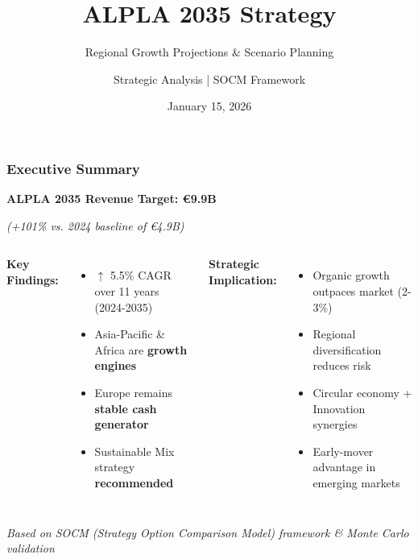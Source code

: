 \documentclass[aspectratio=169,12pt,xcolor=dvipsnames]{beamer}
\title{\textbf{ALPLA 2035 Strategy}}
\subtitle{Regional Growth Projections \& Scenario Planning}
\author{Strategic Analysis | SOCM Framework}
\date{January 15, 2026}
\institute{Evidence-Based Framework for Economic and Social Behavior}
\newcommand{\highlight}[1]{{\color{alpla_blue}\textbf{#1}}}
\newcommand{\increase}[1]{{\color{alpla_green}$\uparrow$ #1}}
\begin{document}

\frame{\titlepage}


\begin{frame}
  \frametitle{Executive Summary}

  \begin{center}
    \large
    \textbf{ALPLA 2035 Revenue Target: \highlight{€9.9B}}

    \vspace{0.5cm}
    \textit{(+101\% vs. 2024 baseline of €4.9B)}
  \end{center}

  \vspace{1cm}

  \begin{columns}[T]
    \textbf{Key Findings:}
    \begin{itemize}
      \item \increase{5.5\% CAGR} over 11 years (2024-2035)
      \item Asia-Pacific \& Africa are \highlight{growth engines}
      \item Europe remains \highlight{stable cash generator}
      \item Sustainable Mix strategy \highlight{recommended}
    \end{itemize}

    \textbf{Strategic Implication:}
    \begin{itemize}
      \item Organic growth outpaces market (2-3\%)
      \item Regional diversification reduces risk
      \item Circular economy + Innovation synergies
      \item Early-mover advantage in emerging markets
    \end{itemize}
  \end{columns}

  \vspace{0.8cm}

  \centering
  \textit{Based on SOCM (Strategy Option Comparison Model) framework \& Monte Carlo validation}

\end{frame}
\end{document}
